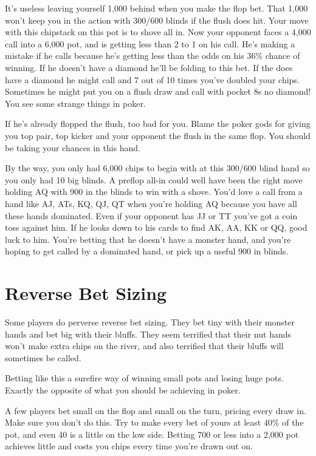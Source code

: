 It's useless leaving yourself 1,000 behind when you make the flop bet.
That 1,000 won't keep you in the action with 300/600 blinds if the
flush does hit. Your move with this chipstack on this pot is to shove
all in. Now your opponent faces a 4,000 call into a 6,000 pot, and is
getting less than 2 to 1 on his call. He's making a mistake if he calls
because he's getting less than the odds on his 36\% chance of winning.
If he doesn't have a diamond he'll be folding to this bet. If the does
have a diamond he might call and 7 out of 10 times you've doubled your chips.
Sometimes he might put you on a flush draw and call with pocket 8s no
diamond! You see some strange things in poker.

If he's already flopped the flush, too bad for you. Blame the poker gods
for giving you top pair, top kicker and your opponent the flush in
the same flop. You should be taking your chances in this hand.

By the way, you only had 6,000 chips to begin with at this 300/600 blind
hand so you only had 10 big blinds. A preflop all-in could well have
been the right move holding AQ with 900 in the blinds to win with a shove.
You'd love a call from a hand like AJ, ATs, KQ, QJ, QT when you're holding
AQ because you have all these hands dominated. Even if your opponent
has JJ or TT you've got a coin toss against him. If he looks down to his
cards to find AK, AA, KK or QQ, good luck to him. You're betting that
he doesn't have a monster hand, and you're hoping to get called by a
dominated hand, or pick up a useful 900 in blinds.

\section{Reverse Bet Sizing}

Some players do perverse reverse bet sizing. They bet tiny with
their monster hands and bet big with their bluffs. They seem terrified
that their nut hands won't make extra chips on the river, and also terrified
that their bluffs will sometimes be called.

Betting like this a surefire way of winning small pots and losing huge pots.
Exactly the opposite of what you should be achieving in poker.

A few players bet small on the flop and small on the turn, pricing every draw
in. Make sure you don't do this. Try to make every bet of yours at least
40\% of the pot, and even 40 is a little on the low side. Betting 700 or less into
a 2,000 pot achieves little and costs you chips every time you're drawn out
on.

